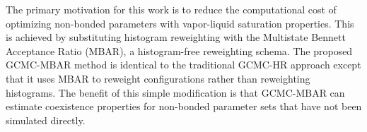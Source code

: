 \documentclass[journal=jced,manuscript=article]{achemso}
\begin{document}
The primary motivation for this work is to reduce the computational cost of optimizing non-bonded parameters with vapor-liquid saturation properties. This is achieved by substituting histogram reweighting with the Multistate Bennett Acceptance Ratio (MBAR), \cite{chodera:jctc:2007,shirts-chodera:jcp:2008:mbar} a histogram-free reweighting schema. The proposed GCMC-MBAR method is identical to the traditional GCMC-HR approach except that it uses MBAR to reweight configurations rather than reweighting histograms. The benefit of this simple modification is that GCMC-MBAR can estimate coexistence properties for non-bonded parameter sets that have not been simulated directly. 

%
%

%
\end{document}
